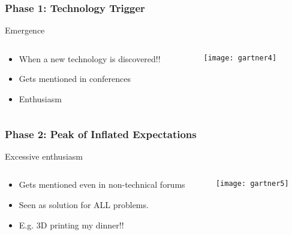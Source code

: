 \begin{frame}[fragile]\frametitle{Phase 1: Technology Trigger}


Emergence

 \begin{columns}
  \begin{column}{0.55\linewidth}
\begin{itemize}
\item When a new technology is discovered!!
\item Gets mentioned in conferences
\item Enthusiasm
\end{itemize}
  \end{column}%
  \begin{column}{0.45\linewidth}
			\begin{center}
			\texttt{[image: gartner4]}
			\end{center}
  \end{column}
 \end{columns}
 
\end{frame}

\begin{frame}[fragile]\frametitle{Phase 2: Peak of Inflated Expectations}

Excessive enthusiasm

 \begin{columns}
  \begin{column}{0.55\linewidth}
\begin{itemize}
\item Gets mentioned even in non-technical forums
\item Seen as solution for ALL problems.
\item E.g. 3D printing my dinner!!
\end{itemize}
  \end{column}%
  \begin{column}{0.45\linewidth}
			\begin{center}
			\texttt{[image: gartner5]}
			\end{center}
  \end{column}
 \end{columns}
 
\end{frame}

